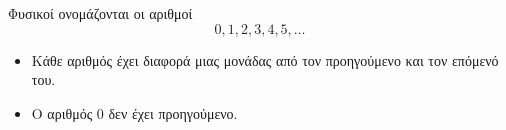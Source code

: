 Φυσικοί ονομάζονται οι αριθμοί
\[ 0,1,2,3,4,5,\ldots \]
\begin{itemize}
\item Κάθε αριθμός έχει διαφορά μιας μονάδας από τον προηγούμενο και τον επόμενό του.
\item Ο αριθμός $ 0 $ δεν έχει προηγούμενο.
\end{itemize}
